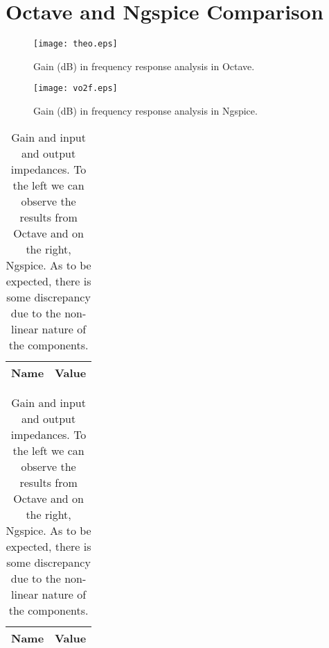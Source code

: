 \section{Octave and Ngspice Comparison}
\label{sec:comparision}

\begin{figure}[H] \centering
\texttt{[image: theo.eps]}
\caption{Gain (dB) in frequency response analysis in Octave.}
\label{fig:theo_comp}
\end{figure}

\begin{figure}[H] \centering
\texttt{[image: vo2f.eps]}
\caption{Gain (dB) in frequency response analysis in Ngspice.}
\label{fig:sim1_comp}
\end{figure}

\begin{table}[H]
  \centering
  \begin{tabular}{|l|r|}
    \hline    
    {\bf Name} & {\bf Value} \\ \hline
	
  \end{tabular}
  \begin{tabular}{|l|r|}
    \hline    
    {\bf Name} & {\bf Value} \\ \hline
	
	
	
  \end{tabular}
  \caption{Gain and input and output impedances. To the left we can observe the results from Octave and on the right, Ngspice. As to be expected, there is some discrepancy due to the non-linear nature of the components.}
  \label{tab:comp}
\end{table}
